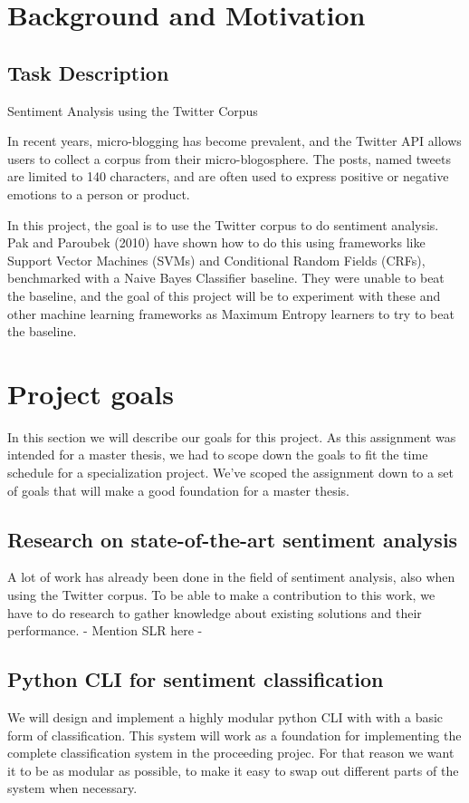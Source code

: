 \section{Background and Motivation}
	\subsection{Task Description}

\begin{center} \Large Sentiment Analysis using the Twitter Corpus \end{center}
\begin{normalsize}
In recent years, micro-blogging has become prevalent, and the Twitter API allows users to collect a corpus from their micro-blogosphere. The posts, named tweets are limited to 140 characters, and are often used to express positive or negative emotions to a person or product.

In this project, the goal is to use the Twitter corpus to do sentiment analysis. Pak and Paroubek (2010) have shown how to do this using frameworks like Support Vector Machines (SVMs) and Conditional Random Fields (CRFs), benchmarked with a Naive Bayes Classifier baseline. They were unable to beat the baseline, and the goal of this project will be to experiment with these and other machine learning frameworks as Maximum Entropy learners to try to beat the baseline.
\end{normalsize}

\section{Project goals}
In this section we will describe our goals for this project. As this assignment was intended for a master thesis, we had to scope down the goals to fit the time schedule for a specialization project. We've scoped the assignment down to a set of goals that will make a good foundation for a master thesis.
	\subsection{Research on state-of-the-art sentiment analysis}
	A lot of work has already been done in the field of sentiment analysis, also when using the Twitter corpus. To be able to make a contribution to this work, we have to do research to gather knowledge about existing solutions and their performance. - Mention SLR here -
	\subsection{Python CLI for sentiment classification}
	We will design and implement a highly modular python CLI with with a basic form of classification. This system will work as a foundation for implementing the complete classification system in the proceeding projec. For that reason we want it to be as modular as possible, to make it easy to swap out different parts of the system when necessary.
